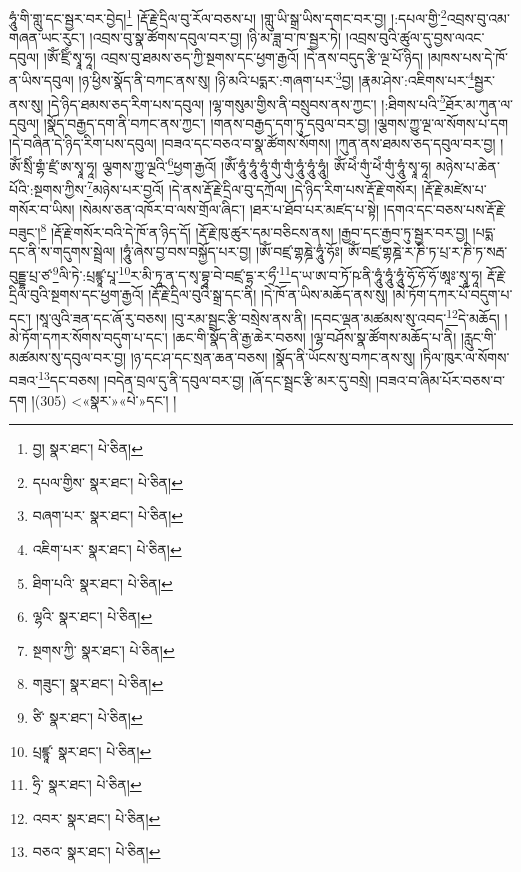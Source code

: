ཧཱུཾ་གི་གླུ་དང་སྦྱར་བར་བྱེད།\footnote{བྱ།  སྣར་ཐང་།  པེ་ཅིན། } །རྡོ་རྗེ་དྲིལ་བུ་རོལ་བཅས་པ། །གླུ་ཡི་སྒྲ་ཡིས་དགང་བར་བྱ། །:དཔལ་གྱི་\footnote{དཔལ་གྱིས་  སྣར་ཐང་།  པེ་ཅིན། }འབྲས་བུ་འམ་གཞན་ཡང་རུང་། །འབྲས་བུ་སྣ་ཚོགས་དབུལ་བར་བྱ། །ཉི་མ་ཟླ་བ་ཁ་སྦྱར་ཏེ། །འབྲས་བུའི་ཚུལ་དུ་བྱས་ལའང་དབུལ། །ཨོཾ་ཛྲིཾ་སྭཱ་ཧཱ། འབྲས་བུ་ཐམས་ཅད་ཀྱི་སྔགས་དང་ཕྱག་རྒྱའོ། །དེ་ནས་བདུད་རྩི་ལྔ་པོ་ཉིད། །མཁས་པས་དེ་ཁོ་ན་ཡིས་དབུལ། །ཉ་ཕྱིས་སྣོད་ནི་བཀང་ནས་སུ། །ཉི་མའི་པདྨར་:གཞག་པར་\footnote{བཞག་པར་  སྣར་ཐང་།  པེ་ཅིན། }བྱ། །རྣམ་ཤེས་:འཇིགས་པར་\footnote{འཇིག་པར་  སྣར་ཐང་།  པེ་ཅིན། }སྦྱར་ནས་སུ། །དེ་ཉིད་ཐམས་ཅད་རིག་པས་དབུལ། །ལྷ་གསུམ་གྱིས་ནི་བསྲུབས་ནས་ཀྱང་། །:ཐིགས་པའི་\footnote{ཐིག་པའི་  སྣར་ཐང་།  པེ་ཅིན། }ཐོར་མ་ཀུན་ལ་དབུལ། །སྣོད་བརྒྱད་དག་ནི་བཀང་ནས་ཀྱང་། །གནས་བརྒྱད་དག་ཏུ་དབུལ་བར་བྱ། །ལྕགས་ཀྱུ་ལྔ་ལ་སོགས་པ་དག །དེ་བཞིན་དེ་ཉིད་རིག་པས་དབུལ། །བཟའ་དང་བཅའ་བ་སྣ་ཚོགས་སོགས། །ཀུན་ནས་ཐམས་ཅད་དབུལ་བར་བྱ། །ཨོཾ་སྲིཾ་གྷཾ་ཛྲཾ་ཨ་སྭཱ་ཧཱ། ལྕགས་ཀྱུ་ལྔའི་\footnote{ལྷའི་  སྣར་ཐང་།  པེ་ཅིན། }ཕྱག་རྒྱའོ། །ཨོཾ་ཧཱུཾ་ཧཱུཾ་ཧཱུཾ་གུཾ་གུཾ་ཧཱུཾ་ཧཱུཾ་ཧཱུཾ། ཨོཾ་ཕེཾ་གུཾ་ཕེཾ་གུཾ་ཧཱུཾ་སྭཱ་ཧཱ། མཉེས་པ་ཆེན་པོའི་:སྔགས་ཀྱིས་\footnote{སྔགས་ཀྱི་  སྣར་ཐང་།  པེ་ཅིན། }མཉེས་པར་བྱའོ། །དེ་ནས་རྡོ་རྗེ་དྲིལ་བུ་དཀྲོལ། །དེ་ཉིད་རིག་པས་རྡོ་རྗེ་གསོར། །རྡོ་རྗེ་མཛེས་པ་གསོར་བ་ཡིས། །སེམས་ཅན་འཁོར་བ་ལས་གྲོལ་ཞིང་། །ཐར་པ་ཐོབ་པར་མཛད་པ་སྟེ། །དགའ་དང་བཅས་པས་རྡོ་རྗེ་བཟུང་།\footnote{གཟུང་།  སྣར་ཐང་།  པེ་ཅིན། } །རྡོ་རྗེ་གསོར་བའི་དེ་ཁོ་ན་ཉིད་དོ། །རྡོ་རྗེ་ཁུ་ཚུར་དམ་བཅིངས་ནས། །རྒྱབ་དང་རྒྱབ་ཏུ་སྦྱར་བར་བྱ། །པདྨ་དང་ནི་ས་གདུགས་སྦྲེལ། །ཧཱུཾ་ཞེས་བྱ་བས་བསྐྱོད་པར་བྱ། །ཨོཾ་བཛྲ་གྷཎྜེ་ཧཱུཾ་ཧོཿ། ཨོཾ་བཛྲ་གྷཎྜེ་ར་ཎི་ཏ་པྲ་ར་ཎི་ཏ་སརྦ་བུདྡྷ་པྲ་ཙ་\footnote{ཙི་  སྣར་ཐང་།  པེ་ཅིན། }ལི་ཏེ་:པྲཛྙཱ་པཱ་\footnote{པྲཛྙཱ་  སྣར་ཐང་།  པེ་ཅིན། }ར་མི་ཏཱ་ན་ད་སྭ་བྷཱ་བེ་བཛྲ་དྷ་ར་ཧྲྀ་\footnote{ཧྲི་  སྣར་ཐང་།  པེ་ཅིན། }ད་ཡ་ཨ་བ་ཏོ་ཥ་ནི་ཧཱུཾ་ཧཱུཾ་ཧཱུཾ་ཧོ་ཧོ་ཧོ་ཨཱཿ་སྭཱ་ཧཱ། རྡོ་རྗེ་དྲིལ་བུའི་སྔགས་དང་ཕྱག་རྒྱའོ། །རྡོ་རྗེ་དྲིལ་བུའི་སྒྲ་དང་ནི། །དེ་ཁོ་ན་ཡིས་མཆོད་ནས་སུ། །མེ་ཏོག་དཀར་པོ་བདུག་པ་དང་། །སཱ་ལུའི་ཟན་དང་ཞོ་རུ་བཅས། །བུ་རམ་སྦྲང་རྩི་བསྲེས་ནས་ནི། །དབང་ལྡན་མཚམས་སུ་འབད་\footnote{འབར་  སྣར་ཐང་།  པེ་ཅིན། }དེ་མཆོད། །མེ་ཏོག་དཀར་སོགས་བདུག་པ་དང་། །ཆང་གི་སྣོད་ནི་རྒྱ་ཆེར་བཅས། །ལྷ་བཤོས་སྣ་ཚོགས་མཆོད་པ་ནི། །རླུང་གི་མཚམས་སུ་དབུལ་བར་བྱ། །ཉ་དང་ཤ་དང་སྲན་ཆན་བཅས། །སྣོད་ནི་ཡོངས་སུ་བཀང་ནས་སུ། །ཏིལ་ཁུར་ལ་སོགས་བཟའ་\footnote{བཅའ་  སྣར་ཐང་།  པེ་ཅིན། }དང་བཅས། །བདེན་བྲལ་དུ་ནི་དབུལ་བར་བྱ། །ཞོ་དང་སྦྲང་རྩི་མར་དུ་བསྲེ། །བཟའ་བ་ཞིམ་པོར་བཅས་བ་དག །(305) <«སྣར་»«པེ་»དང་། །
